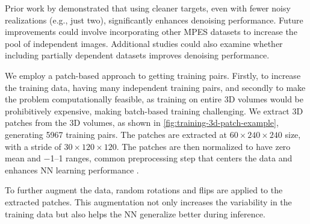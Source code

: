 Prior work by \citeauthor{lehtinenNoise2NoiseLearningImage2018} demonstrated that using cleaner targets, even with fewer noisy realizations (e.g., just two), significantly enhances denoising performance. Future improvements could involve incorporating other \gls{MPES} datasets to increase the pool of independent images. Additional studies could also examine whether including partially dependent datasets improves denoising performance.

We employ a patch-based approach to getting training pairs. Firstly, to increase the training data, having many independent training pairs, and secondly to make the problem computationally feasible, as training on entire 3D volumes would be prohibitively expensive, making batch-based training challenging. We extract 3D patches from the 3D volumes, as shown in \cref{fig:training-3d-patch-example}, generating \num{5967} training pairs. The patches are extracted at $60 \times 240 \times 240$ size, with a stride of $30 \times 120 \times 120$. The patches are then normalized to have zero mean and \numrange{-1}{1} ranges, common preprocessing step that centers the data and enhances \gls{NN} learning performance \cite{bishopDeepLearningFoundations2024}. 

To further augment the data, random rotations and flips are applied to the extracted patches. This augmentation not only increases the variability in the training data but also helps the \gls{NN} generalize better during inference.

